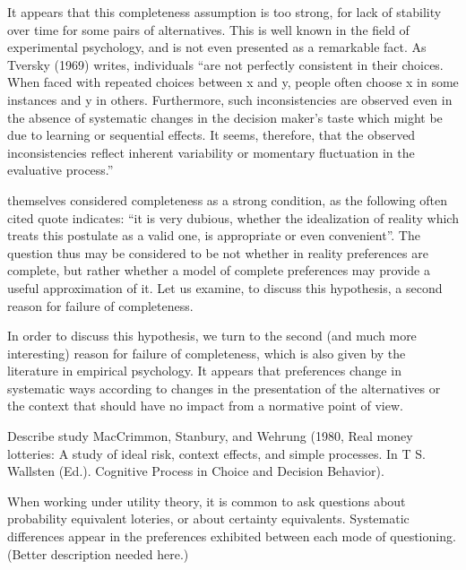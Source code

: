 \documentclass[french, english]{llncs}
\begin{document}
	It appears that this completeness assumption is too strong, for lack of stability over time for some pairs of alternatives. This is well known in the field of experimental psychology, and is not even presented as a remarkable fact. As Tversky (1969) writes, individuals “are not perfectly consistent in their choices. When faced with repeated choices between x and y, people often choose x in some instances and y in others. Furthermore, such inconsistencies are observed even in the absence of systematic changes in the decision maker’s taste which might be due to learning or sequential effects. It seems, therefore, that the observed inconsistencies reflect inherent variability or momentary fluctuation in the evaluative process.” 
	
	\citet[p. 630]{vNM} themselves considered completeness as a strong condition, as the following often cited quote indicates: “it is very dubious, whether the idealization of reality which treats this postulate as a valid one, is appropriate or even convenient”.
	The question thus may be considered to be not whether in reality preferences are complete, but rather whether a model of complete preferences may provide a useful approximation of it. Let us examine, to discuss this hypothesis, a second reason for failure of completeness.
	
	In order to discuss this hypothesis, we turn to the second (and much more interesting) reason for failure of completeness, which is also given by the literature in empirical psychology. It appears that preferences change in systematic ways according to changes in the presentation of the alternatives or the context that should have no impact from a normative point of view.
	
	
	Describe study MacCrimmon, Stanbury, and Wehrung (1980, Real money lotteries: A study of ideal risk, context effects, and simple processes. In T S. Wallsten (Ed.). Cognitive Process in Choice and Decision Behavior).
	
	When working under utility theory, it is common to ask questions about probability equivalent loteries, or about certainty equivalents. Systematic differences appear in the preferences exhibited between each mode of questioning. (Better description needed here.) 
	
\end{document}

